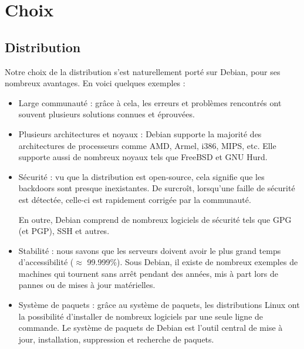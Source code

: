
\section{Choix}
\label{sec:choix}


\subsection{Distribution}
\label{subsec:distribution}

Notre choix de la distribution s'est naturellement porté sur Debian, pour ses
nombreux avantages. En voici quelques exemples :

\begin{itemize}
    \item Large communauté : grâce à cela, les erreurs et problèmes rencontrés ont
      souvent plusieurs solutions connues et éprouvées.

    \item Plusieurs architectures et noyaux : Debian supporte la majorité des
      architectures de processeurs comme AMD, Armel, i386, MIPS, etc. Elle supporte
      aussi de nombreux noyaux tels que FreeBSD et GNU Hurd.

    \item Sécurité : vu que la distribution est open-source, cela signifie que les
      backdoors sont presque inexistantes. De surcroît, lorsqu'une faille de sécurité
      est détectée, celle-ci est rapidement corrigée par la communauté.

      En outre, Debian comprend de nombreux logiciels de sécurité tels que GPG (et
      PGP), SSH et autres.

    \item Stabilité : nous savons que les serveurs doivent avoir le plus grand temps
    d'accessibilité ($\approx$ 99.999\%). Sous Debian, il existe de nombreux exemples de
    machines qui tournent sans arrêt pendant des années, mis à part lors de pannes
    ou de mises à jour matérielles.

    \item Système de paquets : grâce au système de paquets, les distributions Linux
    ont la possibilité d'installer de nombreux logiciels par une seule ligne de
    commande. Le système de paquets de Debian est l'outil central de mise à jour,
    installation, suppression et recherche de paquets.
\end{itemize}

